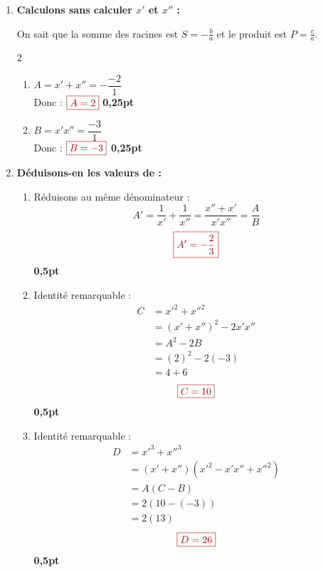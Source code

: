\documentclass[12pt,a4paper]{article}
\newcommand{\redtitle}[1]{\textcolor{myred}{\textbf{#1}}}
\newcommand{\redbox}[1]{\color{myred}\boxed{#1}\color{black}}
\begin{document}
\begin{enumerate}
    \item \redtitle{Calculons sans calculer $x'$ et $x''$ :}
    
    On sait que la somme des racines est $S = -\frac{b}{a}$ et le produit est $P = \frac{c}{a}$.
    
    \begin{multicols}{2}
    \setlength{\columnseprule}{0.1mm}
    \begin{enumerate}
        \item $A = x' + x'' = -\dfrac{-2}{1}$ \\
        Donc : $\redbox{A = 2}$ \hfill \textbf{0,25pt}
        \item $B = x'x'' = \dfrac{-3}{1}$ \\
        Donc : $\redbox{B = -3}$ \hfill \textbf{0,25pt}
    \end{enumerate}
    \end{multicols}

    \item \redtitle{Déduisons-en les valeurs de :}
    
    \begin{enumerate}
        \item Réduisons au même dénominateur :
        \[ A' = \dfrac{1}{x'} + \dfrac{1}{x''} = \dfrac{x'' + x'}{x'x''} = \dfrac{A}{B} \]
        \[ \redbox{A' = -\dfrac{2}{3}} \] \hfill \textbf{0,5pt}
        
        \item Identité remarquable :
        \begin{align*}
            C &= {x'}^2 + {x''}^2 \\
              &= (x' + x'')^2 - 2x'x'' \\
              &= A^2 - 2B \\
              &= (2)^2 - 2(-3) \\
              &= 4 + 6
        \end{align*}
        \[ \redbox{C = 10} \] \hfill \textbf{0,5pt}
        
        \item Identité remarquable :
        \begin{align*}
            D &= {x'}^3 + {x''}^3 \\
              &= (x' + x'')( {x'}^2 - x'x'' + {x''}^2 ) \\
              &= A(C - B) \\
              &= 2(10 - (-3)) \\
              &= 2(13)
        \end{align*}
        \[ \redbox{D = 26} \] \hfill \textbf{0,5pt}
    \end{enumerate}

\end{enumerate}
\end{document}
